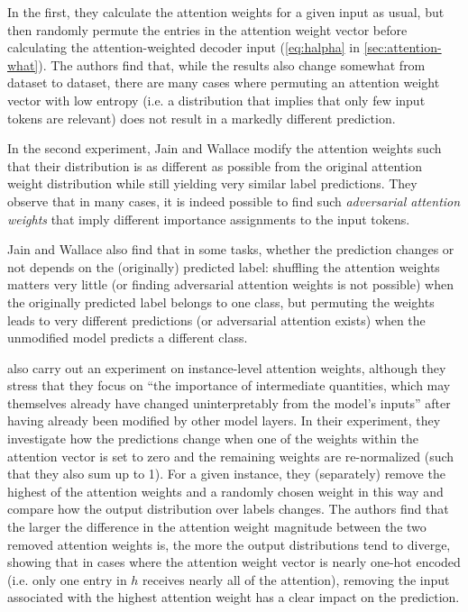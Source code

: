 In the first, they calculate the attention weights for a given input as usual, but then randomly permute the entries in the attention weight vector before calculating the attention-weighted decoder input (\autoref{eq:halpha} in  \autoref{sec:attention-what}).
The authors find that, while the results also change somewhat from dataset to dataset, there are many cases where permuting an attention weight vector with low entropy (i.e. a distribution that implies that only few input tokens are relevant) does not result in a markedly different prediction.

In the second experiment, Jain and Wallace modify the attention weights such that their distribution is as different as possible from the original attention weight distribution while still yielding very similar label predictions.
They observe that in many cases, it is indeed possible to find such \textit{adversarial attention weights} that imply different importance assignments to the input tokens.

Jain and Wallace also find that in some tasks, whether the prediction changes or not depends on the (originally) predicted label: shuffling the attention weights matters very little (or finding adversarial attention weights is not possible) when the originally predicted label belongs to one class, but permuting the weights leads to very different predictions (or adversarial attention exists) when the unmodified model predicts a different class.

\citet{serrano2019attention} also carry out an experiment on instance-level attention weights, although they stress that they focus on ``the importance of intermediate quantities, which may themselves already have changed uninterpretably from the model’s inputs'' after having already been modified by other model layers.
In their experiment, they investigate how the predictions change when one of the weights within the attention vector is set to zero and the remaining weights are re-normalized (such that they also sum up to 1). 
For a given instance, they (separately) remove the highest of the attention weights and a randomly chosen weight in this way and compare how the output distribution over labels changes.
The authors find that the larger the difference in the attention weight magnitude between the two removed attention weights is, the more the output distributions tend to diverge, showing that in cases where the attention weight vector is nearly one-hot encoded (i.e. only one entry in $h$ receives nearly all of the attention), removing the input associated with the highest attention weight has a clear impact on the prediction.

